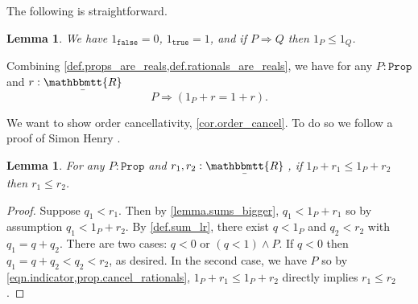 \documentclass[11pt, oneside, article]{memoir}
\theoremstyle{plain}
\newtheorem{lemma}[theorem]{Lemma}
\theoremstyle{definition}
\theoremstyle{remark}
\newcommand{\const}[1]{\mathtt{#1}}
\newcommand{\ubar}[1]{\underaccent{\bar}{#1}}
\newcommand{\ind}[1]{1_{#1}}
\newcommand{\internal}[1]{\raisebox{-.03ex}{$\mathbbmtt{#1}$}}
\newcommand{\hs}{\hspace{1.1pt}}
\newcommand{\trr}{\internal{R}\hs}
\newcommand{\tlrr}{\ubar{\trr}\hs}
\newcommand{\prop}{\const{Prop}}
\newcommand{\imp}{\Rightarrow}
\newcommand{\true}{\const{true}}
\newcommand{\false}{\const{false}}
\begin{document}
The following is straightforward.
\begin{lemma}\label{lemma.ind_monotonic}
We have $\ind{\false}=0$, $\ind{\true}=1$, and if $P\imp Q$ then $\ind{P}\leq\ind{Q}$.
\end{lemma}

Combining \cref{def.props_are_reals,def.rationals_are_reals}, we have for any $P:\prop$ and $r:\tlrr$
\begin{equation}\label{eqn.indicator}
P\imp (\ind{P}+r=1+r).
\end{equation}

We want to show order cancellativity, \cref{cor.order_cancel}. To do so we follow a proof of Simon Henry \cite{Henry}.%

\begin{lemma}\label{lemma.order_cancel_props}
For any $P:\prop$ and $r_1,r_2:\tlrr$, if $\ind{P}+r_1\leq \ind{P}+r_2$ then $r_1\leq r_2$.
\end{lemma}
\begin{proof}
Suppose $q_1<r_1$. Then by \cref{lemma.sums_bigger}, $q_1<\ind{P}+r_1$ so by assumption $q_1<\ind{P}+r_2$. By \cref{def.sum_lr}, there exist $q<\ind{P}$ and $q_2<r_2$ with $q_1=q+q_2$. There are two cases: $q<0$ or $(q<1)\wedge P$. If $q<0$ then $q_1=q+q_2<q_2<r_2$, as desired. In the second case, we have $P$ so by \cref{eqn.indicator,prop.cancel_rationals}, $\ind{P}+r_1\leq \ind{P}+r_2$ directly implies $r_1\leq r_2$.
\end{proof}
\end{document}
